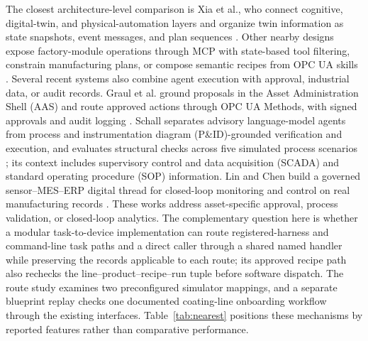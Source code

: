 The closest architecture-level comparison is Xia et al., who connect cognitive,
digital-twin, and physical-automation layers and organize twin information as
state snapshots, event messages, and plan sequences
\cite{xia2025architecture}. Other nearby designs expose factory-module
operations through MCP with state-based tool filtering, constrain
manufacturing plans, or compose semantic recipes from OPC UA skills
\cite{koehle2026llmdriven,silva2025mcpmanufacturing,koehle2025semanticrecipes}.
Several recent systems also combine agent execution with approval, industrial
data, or audit records. Graul et al. ground proposals in the Asset
Administration Shell (AAS) and route approved actions through OPC UA Methods,
with signed approvals and audit logging \cite{graul2026aas}. Schall separates
advisory language-model agents from process and instrumentation diagram
(P\&ID)-grounded verification and execution, and evaluates structural checks
across five simulated process scenarios \cite{schall2026safe}; its context
includes supervisory control and data acquisition (SCADA) and standard
operating procedure (SOP) information. Lin and Chen build a governed
sensor--MES--ERP digital thread for closed-loop monitoring and control on real
manufacturing records \cite{lin2026agentic}. These works address
asset-specific approval, process validation, or closed-loop analytics. The
complementary question here is whether a modular task-to-device implementation
can route registered-harness and command-line task paths and a direct caller
through a shared named handler while preserving the records applicable to each
route; its approved recipe path also rechecks the
line--product--recipe--run tuple before software dispatch. The route study
examines two preconfigured simulator mappings, and a separate blueprint replay
checks one documented coating-line onboarding workflow through the existing
interfaces. Table~\ref{tab:nearest} positions these mechanisms by reported
features rather than comparative performance.
